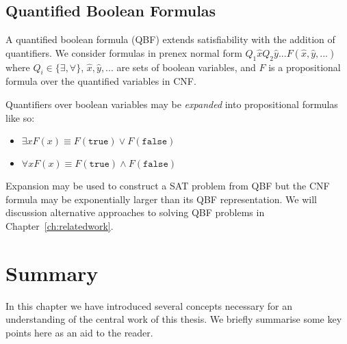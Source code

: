 \subsection{Quantified Boolean Formulas}
\label{sec:backgroundQBF}

A quantified boolean formula (QBF) extends satisfiability with the addition of quantifiers. We consider formulas in prenex normal form $Q_1 \hat{x} Q_2 \hat{y} ... F(\hat{x}, \hat{y}, ...)$ where $Q_i \in \{ \exists, \forall \}$, $\hat{x}, \hat{y}, ...$ are sets of boolean variables, and $F$ is a propositional formula over the quantified variables in CNF.

Quantifiers over boolean variables may be \emph{expanded} into propositional formulas like so:

\begin{itemize}
    \item $\exists x F(x) \equiv F(\texttt{true}) \lor F(\texttt{false})$
    \item $\forall x F(x) \equiv F(\texttt{true}) \land F(\texttt{false})$
\end{itemize}

Expansion may be used to construct a SAT problem from QBF but the CNF formula may be exponentially larger than its QBF representation. We will discussion alternative approaches to solving QBF problems in Chapter~\ref{ch:relatedwork}.

\section{Summary}

In this chapter we have introduced several concepts necessary for an understanding of the central work of this thesis. We briefly summarise some key points here as an aid to the reader.

